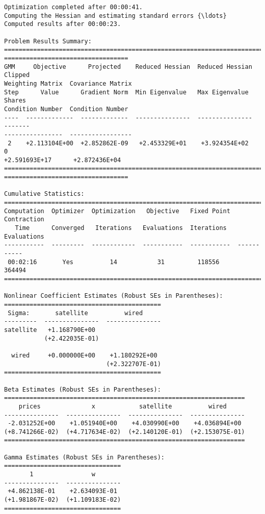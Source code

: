 \begin{Verbatim}[commandchars=\\\{\}]
Optimization completed after 00:00:41.
Computing the Hessian and estimating standard errors {\ldots}
Computed results after 00:00:23.

Problem Results Summary:
================================================================================
==================================
GMM     Objective      Projected    Reduced Hessian  Reduced Hessian  Clipped
Weighting Matrix  Covariance Matrix
Step      Value      Gradient Norm  Min Eigenvalue   Max Eigenvalue   Shares
Condition Number  Condition Number
----  -------------  -------------  ---------------  ---------------  -------
----------------  -----------------
 2    +2.113104E+00  +2.852862E-09   +2.453329E+01    +3.924354E+02      0
+2.591693E+17      +2.872436E+04
================================================================================
==================================

Cumulative Statistics:
===========================================================================
Computation  Optimizer  Optimization   Objective   Fixed Point  Contraction
   Time      Converged   Iterations   Evaluations  Iterations   Evaluations
-----------  ---------  ------------  -----------  -----------  -----------
 00:02:16       Yes          14           31         118556       364494
===========================================================================

Nonlinear Coefficient Estimates (Robust SEs in Parentheses):
===========================================
 Sigma:       satellite          wired
---------  ---------------  ---------------
satellite   +1.168790E+00
           (+2.422035E-01)

  wired     +0.000000E+00    +1.180292E+00
                            (+2.322707E-01)
===========================================

Beta Estimates (Robust SEs in Parentheses):
==================================================================
    prices              x            satellite          wired
---------------  ---------------  ---------------  ---------------
 -2.031252E+00    +1.051940E+00    +4.030990E+00    +4.036894E+00
(+8.741266E-02)  (+4.717634E-02)  (+2.140120E-01)  (+2.153075E-01)
==================================================================

Gamma Estimates (Robust SEs in Parentheses):
================================
       1                w
---------------  ---------------
 +4.862138E-01    +2.634093E-01
(+1.981867E-02)  (+1.109183E-02)
================================
    \end{Verbatim}


